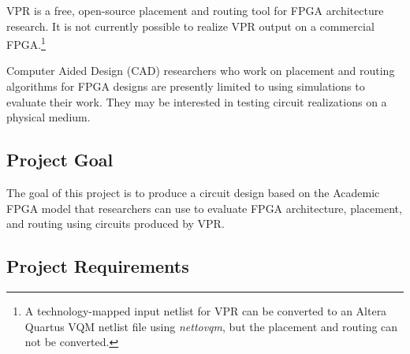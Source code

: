 VPR is a free, open-source placement and routing tool for FPGA architecture research.
It is not currently possible to realize VPR output on a commercial FPGA.\footnote{A technology-mapped input netlist for VPR can be converted to an Altera Quartus VQM netlist file using \emph{nettovqm}\cite{nettovqm}, but the placement and routing can not be converted.}

Computer Aided Design (CAD) researchers who work on placement and routing algorithms for FPGA designs are presently limited to using simulations to evaluate their work.
They may be interested in testing circuit realizations on a physical medium.



\subsection{Project Goal}

% 

The goal of this project is to produce a circuit design based on the Academic FPGA model that researchers can use to evaluate FPGA architecture, placement, and routing using circuits produced by VPR.



\subsection{Project Requirements}

